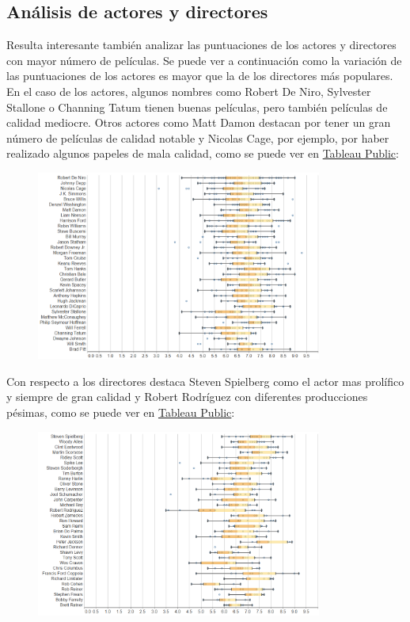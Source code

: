 \documentclass{article}
\begin{document}
\clearpage

\subsection{Análisis de actores y directores}

Resulta interesante también analizar las puntuaciones de los actores y directores con mayor número de películas. Se puede ver a continuación como la variación de las puntuaciones de los actores es mayor que la de los directores más populares. En el caso de los actores, algunos nombres como Robert De Niro, Sylvester Stallone o Channing Tatum tienen buenas películas, pero también películas de calidad mediocre. Otros actores como Matt Damon destacan por tener un gran número de películas de calidad notable y Nicolas Cage, por ejemplo, por haber realizado algunos papeles de mala calidad, como se puede ver en \href{https://public.tableau.com/profile/javier6580\#!/vizhome/proyecto_fin_de_master_dataset/rating_actors}{Tableau Public}:

\begin{figure}[h]
\centering
\includegraphics[width=3.7in,clip,keepaspectratio]{./images/rating_actors}
\end{figure}

Con respecto a los directores destaca Steven Spielberg como el actor mas prolífico y siempre de gran calidad y Robert Rodríguez con diferentes producciones pésimas, como se puede ver en \href{https://public.tableau.com/profile/javier6580\#!/vizhome/proyecto_fin_de_master_dataset/rating_directors}{Tableau Public}:

\begin{figure}[h]
\centering
\includegraphics[width=3.7in,clip,keepaspectratio]{./images/rating_directors}
\end{figure}
\end{document}
